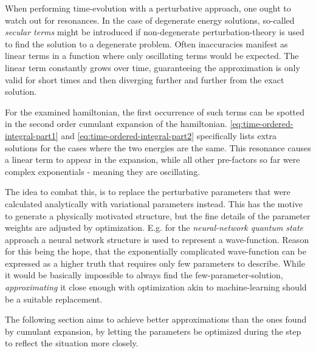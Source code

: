 When performing time-evolution with a perturbative approach, one ought to watch out for resonances.
In the case of degenerate energy solutions, so-called \emph{secular terms} \cite{secularTermsPerturbation} might be introduced if non-degenerate perturbation-theory is used to find the solution to a degenerate problem. 
Often inaccuracies manifest as linear terms in a function where only oscillating terms would be expected.
The linear term constantly grows over time, guaranteeing the approximation is only valid for short times and then diverging further and further from the exact solution.

For the examined hamiltonian, the first occurrence of such terms can be spotted in the second order cumulant expansion of the hamiltonian.
\autoref{eq:time-ordered-integral-part1} and \autoref{eq:time-ordered-integral-part2} specifically lists extra solutions for the cases where the two energies are the same.
This resonance causes a linear term to appear in the expansion, while all other pre-factors so far were complex exponentials - meaning they are oscillating.

The idea to combat this, is to replace the perturbative parameters that were calculated analytically with variational parameters instead.
This has the motive to generate a physically motivated structure, but the fine details of the parameter weights are adjusted by optimization.
E.g. for the \emph{neural-network quantum state} \cite{neuralNetworkQuantumStates} approach a neural network structure is used to represent a wave-function.
Reason for this being the hope, that the exponentially complicated wave-function can be expressed as a \glqq higher truth\grqq{} that requires only few parameters to describe.
While it would be basically impossible to always find the few-parameter-solution, \emph{approximating} it close enough with optimization akin to machine-learning should be a suitable replacement.

The following section aims to achieve better approximations than the ones found by cumulant expansion, by letting the parameters be optimized during the step to reflect the situation more closely.